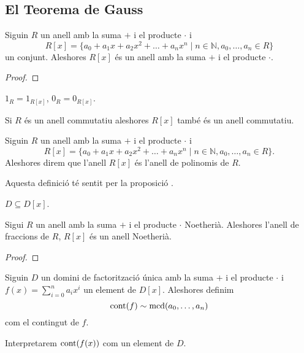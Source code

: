 \documentclass[../Apunts.tex]{subfiles}
\begin{document}
	\subsection{El Teorema de Gauss}
	\begin{proposition}
		\label{prop:l'anell de polinomis és un anell}
		Siguin \(R\) un anell amb la suma \(+\) i el producte \(\cdot\) i
		\[R[x]=\{a_{0}+a_{1}x+a_{2}x^{2}+\dots+a_{n}x^{n}\mid n\in\mathbb{N}, a_{0},\dots,a_{n}\in R\}\]
		un conjunt. Aleshores \(R[x]\) és un anell amb la suma \(+\) i el producte \(\cdot\).
		\begin{proof}
		\end{proof}
	\end{proposition}
	\begin{observation}
		\label{obs:els anells de polinomis conserven neutre i unitat}
		\(1_{R}=1_{R[x]}\), \(0_{R}=0_{R[x]}\).
	\end{observation}
	\begin{observation}
		\label{obs:els anells de polinomis conserven commutativitat}
		Si \(R\) és un anell commutatiu aleshores \(R[x]\) també és un anell commutatiu.
	\end{observation}
	\begin{definition}
		\label{def:anell de polinomis}
		Siguin \(R\) un anell amb la suma \(+\) i el producte \(\cdot\) i
		\[R[x]=\{a_{0}+a_{1}x+a_{2}x^{2}+\dots+a_{n}x^{n}\mid n\in\mathbb{N},a_{0},\dots,a_{n}\in R\}.\]
		Aleshores direm que l'anell \(R[x]\) és l'anell de polinomis de \(R\).
		
		Aquesta definició té sentit per la proposició .
	\end{definition}
	\begin{observation}
		\(D\subseteq D[x]\).
	\end{observation}
	\begin{theorem}
		Sigui \(R\) un anell amb la suma \(+\) i el producte \(\cdot\) Noetherià. Aleshores l'anell de fraccions de \(R\), \(R[x]\) és un anell Noetherià.
		\begin{proof}
		\end{proof}
	\end{theorem}
	\begin{definition}
		\label{def:contingut d'un polinomi}
		Siguin \(D\) un domini de factorització única amb la suma \(+\) i el producte \(\cdot\) i \(f(x)=\sum_{i=0}^{n}a_{i}x^{i}\) un element de \(D[x]\). Aleshores definim
		\[\operatorname{cont}(f)\sim\operatorname{mcd}(a_{0},\dots,a_{n})\]
		com el contingut de \(f\). %
		
		Interpretarem \(\operatorname{cont}(f(x))\) com un element de \(D\).
	\end{definition}
\end{document}
